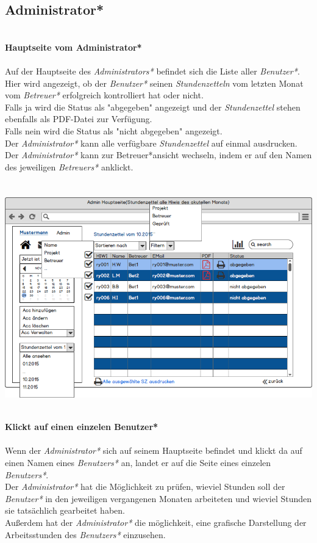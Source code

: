 \subsection{Administrator*}
\textbf{\\Hauptseite vom Administrator*}\\
\\
Auf der Hauptseite des \emph{Administrators*} befindet sich die Liste aller \emph{Benutzer*}. Hier wird angezeigt, ob der \emph{Benutzer*} seinen \emph{Stundenzetteln} vom letzten Monat vom \emph{Betreuer*} erfolgreich kontrolliert hat oder nicht.\\
Falls ja wird die Status als "abgegeben" angezeigt und der \emph{Stundenzettel} stehen ebenfalls als PDF-Datei zur Verfügung.\\
Falls nein wird die Status als "nicht abgegeben" angezeigt.\\
Der \emph{Administrator*} kann alle verfügbare \emph{Stundenzettel} auf einmal ausdrucken.\\
Der \emph{Administrator*} kann zur Betreuer*ansicht wechseln, indem er auf den Namen des jeweiligen \emph{Betreuers*} anklickt.\\
\\
\\
\includegraphics[width=\linewidth]{UI/Admin/Hauptseite.png}

\newpage
\textbf{\\Klickt auf einen einzelen Benutzer*}\\
\\
Wenn der \emph{Administrator*} sich auf seinem Hauptseite befindet und klickt da auf einen Namen eines \emph{Benutzers*} an, landet er auf die Seite eines einzelen \emph{Benutzers*}.\\
Der \emph{Administrator*} hat die Möglichkeit zu prüfen, wieviel Stunden soll der \emph{Benutzer*} in den jeweiligen vergangenen Monaten arbeiteten und wieviel Stunden sie tatsächlich gearbeitet haben.\\
Außerdem hat der \emph{Administrator*} die möglichkeit, eine grafische Darstellung der Arbeitsstunden des \emph{Benutzers*} einzusehen.\\
\\
\\

